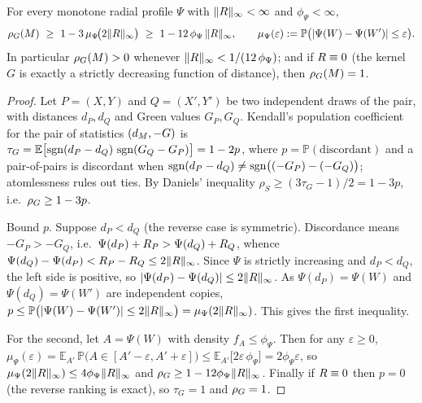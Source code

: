 \begin{theorem}\label{thm:master}
For every monotone radial profile $\Psi$ with $\lVert R\rVert_\infty<\infty$ and
$\phi_\Psi<\infty$,
\[
\rhoG(M)\ \ge\ 1-3\,\mu_\Psi\!\bigl(2\lVert\Rem\rVert_\infty\bigr)\ \ge\
1-12\,\phi_\Psi\,\lVert\Rem\rVert_\infty,
\qquad
\mu_\Psi(\varepsilon):=\mathbb P\bigl(\lvert\Psi(W)-\Psi(W')\rvert\le\varepsilon\bigr).
\]
In particular $\rho_G(M)>0$ whenever $\lVert R\rVert_\infty<1/(12\,\phi_\Psi)$; and if
$R\equiv0$ (the kernel $G$ is exactly a strictly decreasing function of distance),
then $\rho_G(M)=1$.
\end{theorem}

\begin{proof}
Let $P=(X,Y)$ and $Q=(X',Y')$ be two independent draws of the pair, with distances
$d_P,d_Q$ and Green values $G_P,G_Q$. Kendall's population coefficient for the pair of
statistics $(d_M,-G)$ is
$\tau_G=\mathbb E\bigl[\operatorname{sgn}(d_P-d_Q)\,\operatorname{sgn}(G_Q-G_P)\bigr]=1-2p$, where
$p=\mathbb P(\text{discordant})$ and a pair-of-pairs is discordant when
$\operatorname{sgn}(d_P-d_Q)\ne\operatorname{sgn}\bigl((-G_P)-(-G_Q)\bigr)$; atomlessness rules out ties. By Daniels'
inequality $\rho_S\ge(3\tau_G-1)/2=1-3p$, i.e.\ $\rho_G\ge1-3p$.

Bound $p$. Suppose $d_P<d_Q$ (the reverse case is symmetric). Discordance means
$-G_P>-G_Q$, i.e.\ $\Psi(d_P)+R_P>\Psi(d_Q)+R_Q$, whence
$\Psi(d_Q)-\Psi(d_P)<R_P-R_Q\le2\lVert R\rVert_\infty$. Since $\Psi$ is strictly
increasing and $d_P<d_Q$, the left side is positive, so
$\lvert\Psi(d_P)-\Psi(d_Q)\rvert\le2\lVert R\rVert_\infty$. As $\Psi(d_P)=\Psi(W)$ and
$\Psi(d_Q)=\Psi(W')$ are independent copies,
$p\le\mathbb P\bigl(\lvert\Psi(W)-\Psi(W')\rvert\le2\lVert R\rVert_\infty\bigr)
=\mu_\Psi(2\lVert R\rVert_\infty)$. This gives the first inequality.

For the second, let $A=\Psi(W)$ with density $f_A\le\phi_\Psi$. Then for any
$\varepsilon\ge0$,
$\mu_\Psi(\varepsilon)=\mathbb E_{A'}\,\mathbb P\bigl(A\in[A'-\varepsilon,A'+\varepsilon]\bigr)
\le\mathbb E_{A'}\bigl[2\varepsilon\,\phi_\Psi\bigr]=2\phi_\Psi\varepsilon$, so
$\mu_\Psi(2\lVert R\rVert_\infty)\le4\phi_\Psi\lVert R\rVert_\infty$ and
$\rho_G\ge1-12\phi_\Psi\lVert R\rVert_\infty$. Finally if $R\equiv0$ then $p=0$
(the reverse ranking is exact), so $\tau_G=1$ and $\rho_G=1$.
\end{proof}

